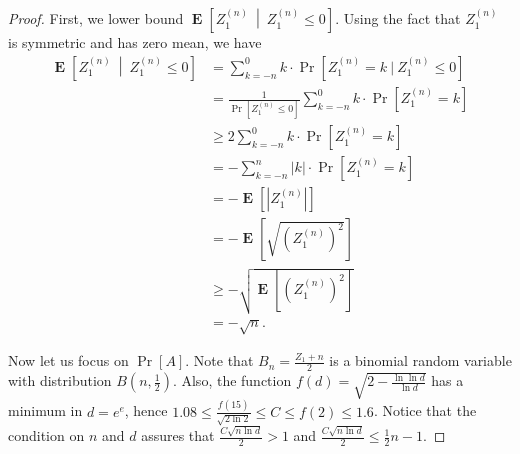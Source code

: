 \documentclass{article}
\DeclareMathOperator*{\Exp}{\mathbf{E}}
\begin{document}
\begin{proof}
First, we lower bound $\Exp \left[ Z^{(n)}_1 ~\middle|~ Z^{(n)}_1 \le 0 \right]$. Using the fact that $Z^{(n)}_1$ is symmetric and has zero mean, we have
\begin{align*}
\Exp \left[ Z^{(n)}_1 ~\middle|~ Z^{(n)}_1 \le 0 \right]
& = \sum_{k=-n}^0 k \cdot \Pr[Z^{(n)}_1 = k ~|~ Z^{(n)}_1 \le 0] \\
& = \frac{1}{\Pr[Z^{(n)}_1 \le 0]} \sum_{k=-n}^0 k \cdot \Pr[Z^{(n)}_1 = k] \\
& \ge 2 \sum_{k=-n}^0 k \cdot \Pr[Z^{(n)}_1 = k] \\
& = - \sum_{k=-n}^n |k| \cdot \Pr[Z^{(n)}_1 = k] \\
& = - \Exp[|Z^{(n)}_1|] \\
& = - \Exp \left[ \sqrt{ \left( Z^{(n)}_1 \right)^2} \right] \\
& \ge - \sqrt{\Exp \left[ \left( Z^{(n)}_1 \right)^2 \right]} \\
& = -\sqrt{n}.
\end{align*}

Now let us focus on $\Pr[A]$. Note that $B_n = \frac{Z_1 + n}{2}$ is a binomial random variable with distribution $B(n,\frac{1}{2})$.
 Also, the function
$f(d)=\sqrt{2-\frac{\ln \ln d}{\ln d}}$ has a minimum in $d=e^e$, hence
$1.08 \le \frac{f(15)}{\sqrt{2 \ln 2}} \le C\le f(2)\le 1.6$.
Notice that the condition on $n$ and $d$ assures that $\frac{C \sqrt{n \ln d}}{2}>1$ and $\frac{C \sqrt{n \ln d}}{2}\le \frac{1}{2} n - 1$.


\end{proof}
\end{document}
